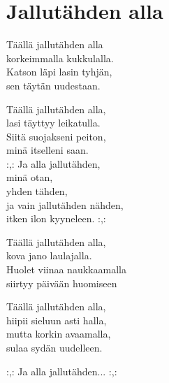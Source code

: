 \section{Jallutähden alla}
Täällä jallutähden alla \\
korkeimmalla kukkulalla. \\
Katson läpi lasin tyhjän, \\
sen täytän uudestaan. 

Täällä jallutähden alla, \\
lasi täyttyy leikatulla. \\
Siitä suojakseni peiton, \\
minä itselleni saan. \\

:,: Ja alla jallutähden, \\
minä otan, \\
yhden tähden,\\ 
ja vain jallutähden nähden, \\
itken ilon kyyneleen. :,:

Täällä jallutähden alla, \\
kova jano laulajalla. \\ 
Huolet viinaa naukkaamalla \\
siirtyy päivään huomiseen

Täällä jallutähden alla, \\
hiipii sieluun asti halla, \\
mutta korkin avaamalla, \\
sulaa sydän uudelleen. 

:,: Ja alla jallutähden... :,: